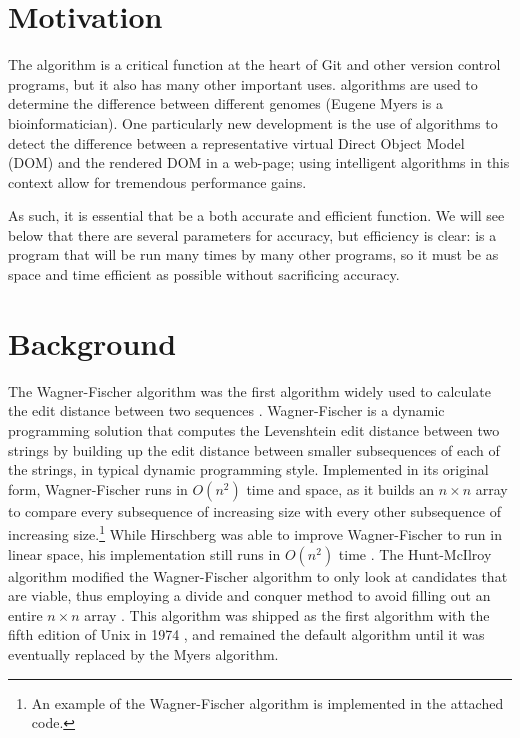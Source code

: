 \documentclass[11pt,letterpaper]{article}
\begin{document}


\section{Motivation}

The \diff algorithm is a critical function at the heart of Git and other version control programs, but it also has many other important uses. \diff algorithms are used to determine the difference between different genomes (Eugene Myers is a bioinformatician). One particularly new development is the use of \diff algorithms to detect the difference between a representative virtual Direct Object Model (DOM) and the rendered DOM in a web-page; using intelligent \diff algorithms in this context allow for tremendous performance gains. 

As such, it is essential that \diff be a both accurate and efficient function. We will see below that there are several parameters for accuracy, but efficiency is clear: \diff is a program that will be run many times by many other programs, so it must be as space and time efficient as possible without sacrificing accuracy. 


\section{Background}

The Wagner-Fischer algorithm was the first algorithm widely used to calculate the edit distance between two sequences \citep{wagner}. Wagner-Fischer is a dynamic programming solution that computes the Levenshtein edit distance between two strings by building up the edit distance between smaller subsequences of each of the strings, in typical dynamic programming style. Implemented in its original form, Wagner-Fischer runs in $O(n^2)$ time and space, as it builds an $n \times n$ array to compare every subsequence of increasing size with every other subsequence of increasing size.\footnote{An example of the Wagner-Fischer algorithm is implemented in the attached code.} While Hirschberg was able to improve Wagner-Fischer to run in linear space, his implementation still runs in $O(n^2)$ time \citep{hirschberg75}. The Hunt-McIlroy algorithm modified the Wagner-Fischer algorithm to only look at candidates that are viable, thus employing a divide and conquer method to avoid filling out an entire $n\times n$ array \citep{hunt}. This algorithm was shipped as the first \diff algorithm with the fifth edition of Unix in 1974 \citep{zeidman}, and remained the default \diff algorithm until it was eventually replaced by the Myers \diff algorithm. 
\end{document}
